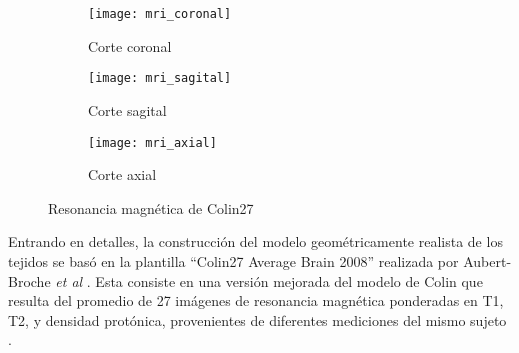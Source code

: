 \begin{figure}[htb]
	\centering
	\begin{subfigure}{0.49\textwidth}
		\centering
		\texttt{[image: mri\_coronal]}
		\caption{Corte coronal}
		\label{fig:left}
	\end{subfigure}
	\begin{subfigure}{0.49\textwidth}
		\centering
		\texttt{[image: mri\_sagital]}
		\caption{Corte sagital}
		\label{fig:top_right}
	\end{subfigure}
	\begin{subfigure}{0.49\textwidth}
		\centering
		\texttt{[image: mri\_axial]}
		\caption{Corte axial} %
		\label{fig:bottom_right} %
	\end{subfigure}
	\caption{Resonancia magnética de Colin27}
	\label{fig:combined}
\end{figure}


Entrando en detalles, la construcción del modelo geométricamente realista de los tejidos se basó en la plantilla ``Colin27 Average Brain 2008'' realizada por Aubert-Broche \emph{et al} \cite{Aubert-Broche2006}. Esta consiste en una versión mejorada del modelo de Colin que resulta del promedio de 27 imágenes de resonancia magnética ponderadas en T1, T2, y densidad protónica, provenientes de diferentes mediciones del mismo sujeto \cite{Holmes1998}. 

